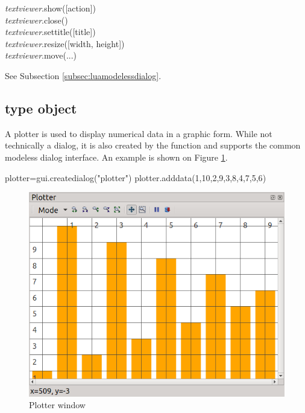 \documentclass[a4paper,12pt,twoside,extrafontsizes]{memoir}
\begin{document}

\begin{luafuncprototype}
\emph{textviewer}.show([action]) \\
\emph{textviewer}.close() \\
\emph{textviewer}.settitle([title]) \\
\emph{textviewer}.resize([width, height]) \\
\emph{textviewer}.move(...)
\end{luafuncprototype}

\begin{funcdescr}
	See Subsection \ref{subsec:luamodelessdialog}.
\end{funcdescr}

\subsection{ type object}
\label{subsec:luaplotter}

A plotter is used to display numerical data in a graphic form. While not technically a dialog, it is also created by the  function and supports the common modeless dialog interface. An example is shown on Figure \ref{fig:luaplotter}.

\begin{shellcmds}\begin{luacode}
plotter=gui.createdialog("plotter")
plotter.adddata({1,10,2,9,3,8,4,7,5,6})
\end{luacode}\end{shellcmds}

\begin{figure}[htbp]
\centering
\includegraphics{images/luaplotter.png}
\caption{Plotter window}
\label{fig:luaplotter}
\end{figure}
\end{document}
